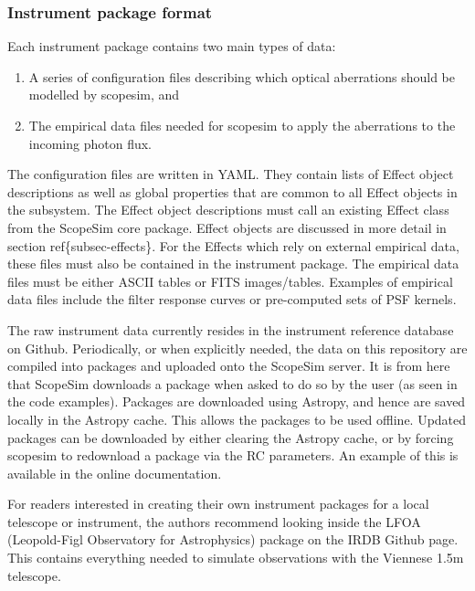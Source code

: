\subsubsection{Instrument package format%
  \label{instrument-package-format}%
}

Each instrument package contains two main types of data:

\begin{enumerate}
\item A series of configuration files describing which optical aberrations should be modelled by scopesim, and

\item The empirical data files needed for scopesim to apply the aberrations to the incoming photon flux.
\end{enumerate}

The configuration files are written in YAML.
They contain lists of Effect object descriptions as well as global properties that are common to all Effect objects in the subsystem.
The Effect object descriptions must call an existing Effect class from the ScopeSim core package.
Effect objects are discussed in more detail in section ref\{subsec-effects\}.
For the Effects which rely on external empirical data, these files must also be contained in the instrument package.
The empirical data files must be either ASCII tables or FITS images/tables.
Examples of empirical data files include the filter response curves or pre-computed sets of PSF kernels.

The raw instrument data currently resides in the instrument reference database on Github.
Periodically, or when explicitly needed, the data on this repository are compiled into packages and uploaded onto the ScopeSim server.
It is from here that ScopeSim downloads a package when asked to do so by the user (as seen in the code examples).
Packages are downloaded using Astropy, and hence are saved locally in the Astropy cache.
This allows the packages to be used offline.
Updated packages can be downloaded by either clearing the Astropy cache, or by forcing scopesim to redownload a package via the RC parameters.
An example of this is available in the online documentation.

For readers interested in creating their own instrument packages for a local telescope or instrument, the authors recommend looking inside the LFOA (Leopold-Figl Observatory for Astrophysics) package on the IRDB Github page.
This contains everything needed to simulate observations with the Viennese 1.5m telescope.

